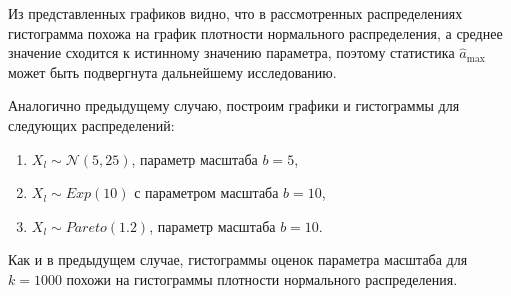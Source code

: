 \documentclass[14pt, a4paper, russian]{report}
\begin{document}


Из представленных графиков видно, что в рассмотренных распределениях гистограмма похожа на график плотности нормального распределения, а среднее значение сходится к истинному значению параметра, поэтому статистика $\hat{a}_{\max}$ может быть подвергнута дальнейшему исследованию.



Аналогично предыдущему случаю, построим графики и гистограммы для следующих распределений:

\begin{enumerate}
  \item $X_l \sim \mathcal{N}(5, 25)$, параметр масштаба $b = 5$,
  \item $X_l \sim Exp(10)$ с параметром масштаба $b = 10$,
  \item $X_l \sim Pareto(1.2)$, параметр масштаба $b = 10$.
\end{enumerate}







Как и в предыдущем случае, гистограммы оценок параметра масштаба для $k = 1000$ похожи на гистограммы плотности нормального распределения.

\newpage

\end{document}

